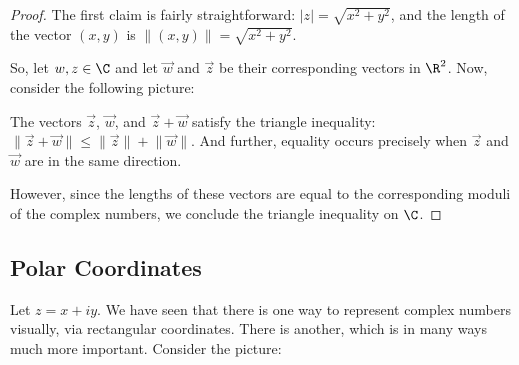 \begin{proof} The first claim is fairly straightforward: $|z| = \sqrt{x^2 + y^2}$, and the length of the vector $(x,y)$ is $\lVert (x,y) \rVert = \sqrt{x^2 + y^2}$.

So, let $w,z\in \C$ and let $\vec{w}$ and $\vec{z}$ be their corresponding vectors in $\R^2$. Now, consider the following picture:

\begin{center}
\end{center}

The vectors $\vec{z}$,  $\vec{w}$, and $\vec{z} + \vec{w}$ satisfy the triangle inequality: $\lVert \vec{z} + \vec{w} \rVert \le \lVert\vec{z}\rVert + \lVert\vec{w}\rVert$. And further, equality occurs precisely when $\vec{z}$ and $\vec{w}$ are in the same direction.

However, since the lengths of these vectors are equal to the corresponding moduli of the complex numbers, we conclude the triangle inequality on $\C$.

\end{proof}

\subsection{Polar Coordinates}

Let $z = x + iy$. We have seen that there is one way to represent complex numbers visually, via rectangular coordinates. There is another, which is in many ways much more important. Consider the picture:

\begin{center}
\end{center}

